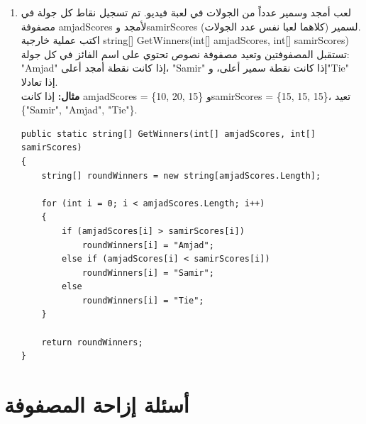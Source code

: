 \documentclass[14pt]{extarticle}
\begin{document}
\begin{enumerate}[resume, itemsep=2em]
    \item
    لعب أمجد وسمير عدداً من الجولات في لعبة فيديو. تم تسجيل نقاط كل جولة في مصفوفة \textenglish{amjadScores} لأمجد و\textenglish{samirScores} لسمير (كلاهما لعبا نفس عدد الجولات).\\
    اكتب عملية خارجية \textenglish{string[] GetWinners(int[] amjadScores, int[] samirScores)} تستقبل المصفوفتين وتعيد مصفوفة نصوص تحتوي على اسم الفائز في كل جولة: \textenglish{"Amjad"} إذا كانت نقطة أمجد أعلى، \textenglish{"Samir"} إذا كانت نقطة سمير أعلى، و\textenglish{"Tie"} إذا تعادلا.\\
    \textbf{مثال:} إذا كانت \textenglish{amjadScores = \{10, 20, 15\}} و\textenglish{samirScores = \{15, 15, 15\}}، تعيد \textenglish{\{"Samir", "Amjad", "Tie"\}}.
    \ifwithsols
    \begin{boxSolution}
    \begin{english}
    \begin{verbatim}
public static string[] GetWinners(int[] amjadScores, int[] samirScores)
{
    string[] roundWinners = new string[amjadScores.Length];

    for (int i = 0; i < amjadScores.Length; i++)
    {
        if (amjadScores[i] > samirScores[i])
            roundWinners[i] = "Amjad";
        else if (amjadScores[i] < samirScores[i])
            roundWinners[i] = "Samir";
        else
            roundWinners[i] = "Tie";
    }

    return roundWinners;
}
    \end{verbatim}
    \end{english}
    \end{boxSolution}
    \fi

\end{enumerate}

\clearpage

\section{أسئلة إزاحة المصفوفة}
\end{document}
